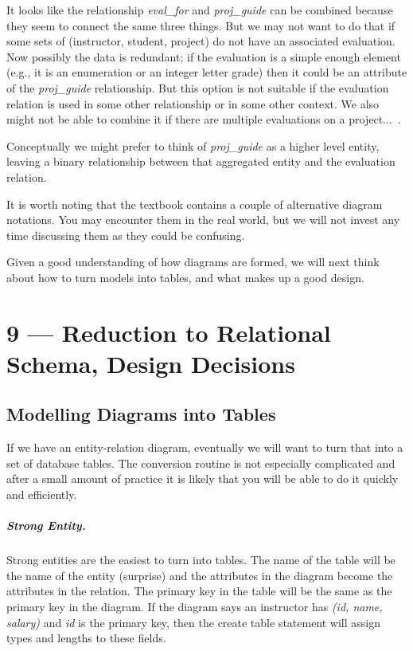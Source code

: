\documentclass[a4paper]{report}
\begin{document}
It looks like the relationship \textit{eval\_for} and \textit{proj\_guide} can be combined because they seem to connect the same three things. But we may not want to do that if some sets of (instructor, student, project) do not have an associated evaluation. Now possibly the data is redundant; if the evaluation is a simple enough element (e.g., it is an enumeration or an integer letter grade) then it could be an attribute of the \textit{proj\_guide} relationship. But this option is not suitable if the evaluation relation is used in some other relationship or in some other context. We  also might not be able to combine it if there are multiple evaluations on a project...~\cite{dsc}.

Conceptually we might prefer to think of \textit{proj\_guide} as a higher level entity,  leaving a binary relationship between that aggregated entity and the evaluation relation.

It is worth noting that the textbook contains a couple of alternative diagram notations. You may encounter them in the real world, but we will not invest any time discussing them as they could be confusing.

Given a good understanding of how diagrams are formed, we will next think about how to turn models into tables, and what makes up a good design.









\chapter*{9 --- Reduction to Relational Schema, Design Decisions}


\section*{Modelling Diagrams into Tables}
If we have an entity-relation diagram, eventually we will want to turn that into a set of database tables. The conversion routine is not especially complicated and after a small amount of practice it is likely that you will be able to do it quickly and efficiently.

\paragraph{Strong Entity.} Strong entities are the easiest to turn into tables. The name of the table will be the name of the entity (surprise) and the attributes in the diagram become the attributes in the relation. The primary key in the table will be the same as the primary key in the diagram. If the diagram says an instructor has \textit{(id, name, salary)} and \textit{id} is the primary key, then the create table statement will assign types and lengths to these fields. 
\end{document}
